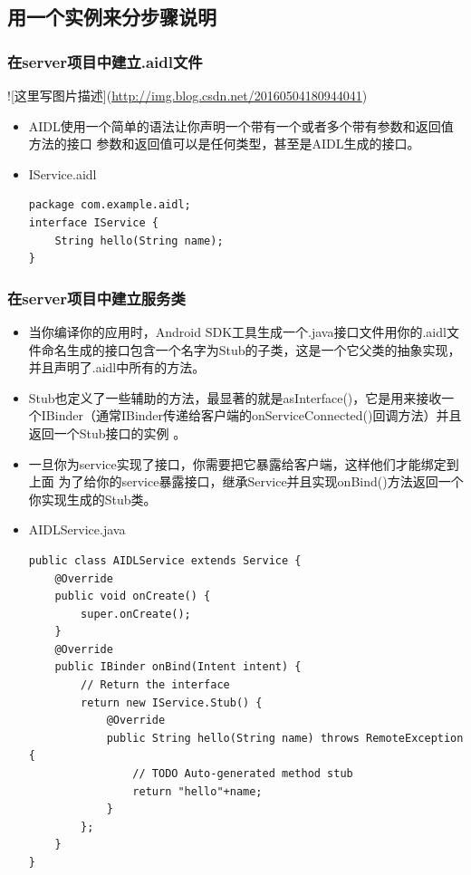 \documentclass[9pt, b5paper]{article}
\begin{document}
\subsection{用一个实例来分步骤说明}
\label{sec-6-4}
\subsubsection{在server项目中建立.aidl文件　}
\label{sec-6-4-1}
![这里写图片描述](\url{http://img.blog.csdn.net/20160504180944041})
\begin{itemize}
\item AIDL使用一个简单的语法让你声明一个带有一个或者多个带有参数和返回值方法的接口 参数和返回值可以是任何类型，甚至是AIDL生成的接口。
\item IService.aidl
\begin{verbatim}
package com.example.aidl;
interface IService {
    String hello(String name); 
}
\end{verbatim}
\end{itemize}
\subsubsection{在server项目中建立服务类}
\label{sec-6-4-2}
\begin{itemize}
\item 当你编译你的应用时，Android SDK工具生成一个.java接口文件用你的.aidl文件命名生成的接口包含一个名字为Stub的子类，这是一个它父类的抽象实现，并且声明了.aidl中所有的方法。
\item Stub也定义了一些辅助的方法，最显著的就是asInterface()，它是用来接收一个IBinder（通常IBinder传递给客户端的onServiceConnected()回调方法）并且返回一个Stub接口的实例 。
\item 一旦你为service实现了接口，你需要把它暴露给客户端，这样他们才能绑定到上面 为了给你的service暴露接口，继承Service并且实现onBind()方法返回一个你实现生成的Stub类。
\item AIDLService.java
\begin{verbatim}
public class AIDLService extends Service {
    @Override
    public void onCreate() {
        super.onCreate();
    }
    @Override
    public IBinder onBind(Intent intent) {
        // Return the interface
        return new IService.Stub() {
            @Override
            public String hello(String name) throws RemoteException {
                // TODO Auto-generated method stub
                return "hello"+name;
            }
        };
    }
}
\end{verbatim}
\end{itemize}
\end{document}
